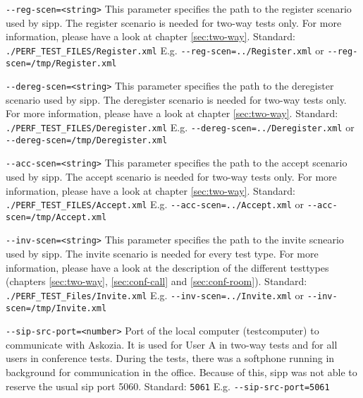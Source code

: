 \begin{description}
\item {\texttt{-{}-reg-scen=<string>}} \newline
This parameter specifies the path to the register scenario used by sipp.
The register scenario is needed for two-way tests only.
For more information, please have a look at chapter \ref{sec:two-way}.
\newline Standard: \texttt{./PERF\_TEST\_FILES/Register.xml}
\newline E.g. \texttt{-{}-reg-scen=../Register.xml} or \texttt{-{}-reg-scen=/tmp/Register.xml}

\item {\texttt{-{}-dereg-scen=<string>}} \newline
This parameter specifies the path to the deregister scenario used by sipp.
The deregister scenario is needed for two-way tests only.
For more information, please have a look at chapter \ref{sec:two-way}.
\newline Standard: \texttt{./PERF\_TEST\_FILES/Deregister.xml}
\newline E.g. \texttt{-{}-dereg-scen=../Deregister.xml} or \texttt{-{}-dereg-scen=/tmp/Deregister.xml}

\item {\texttt{-{}-acc-scen=<string>}} \newline
This parameter specifies the path to the accept scenario used by sipp.
The accept scenario is needed for two-way tests only.
For more information, please have a look at chapter \ref{sec:two-way}.
\newline Standard: \texttt{./PERF\_TEST\_FILES/Accept.xml}
\newline E.g. \texttt{-{}-acc-scen=../Accept.xml} or \texttt{-{}-acc-scen=/tmp/Accept.xml}

\item {\texttt{-{}-inv-scen=<string>}} \newline
This parameter specifies the path to the invite scneario used by sipp.
The invite scenario is needed for every test type.
For more information, please have a look at the description of the
different testtypes (chapters \ref{sec:two-way}, \ref{sec:conf-call} and \ref{sec:conf-room}).
\newline Standard: \texttt{./PERF\_TEST\_Files/Invite.xml}
\newline E.g. \texttt{-{}-inv-scen=../Invite.xml} or \texttt{-{}-inv-scen=/tmp/Invite.xml}

\item {\texttt{-{}-sip-src-port=<number>}} \newline
Port of the local computer (testcomputer) to communicate with Askozia.
It is used for User A in two-way tests and for all users in conference tests.
During the tests, there was a softphone running in background for communication
in the office. Because of this, sipp was not able to reserve the usual sip port 5060.
\newline Standard: \texttt{5061}
\newline E.g. \texttt{-{}-sip-src-port=5061}


\end{description}
